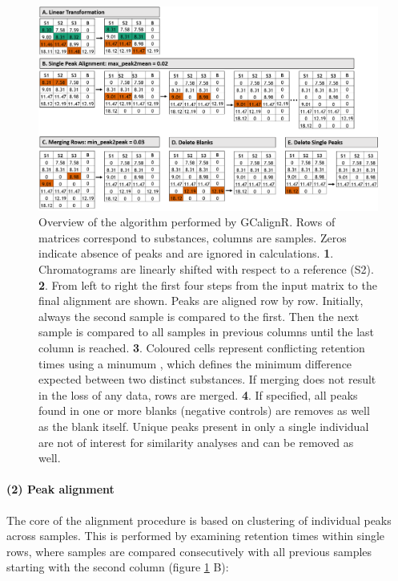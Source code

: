 \begin{figure}[htbp]
  \centering
  \includegraphics[width=13cm]{figures/algorithm}
  \caption{Overview of the algorithm performed by GCalignR. Rows of matrices correspond to substances, columns are samples. Zeros indicate absence of peaks and are ignored in calculations. \textbf{1}. Chromatograms are linearly shifted with respect to a reference (S2). \textbf{2}. From left to right the first four steps from the input matrix to the final alignment are shown. Peaks are aligned row by row. Initially, always the second sample is compared to the first. Then the next sample is compared to all samples in previous columns until the last column is reached. \textbf{3}. Coloured cells represent conflicting retention times using a minumum , which defines the minimum difference expected between two distinct substances. If merging does not result in the loss of any data, rows are merged. \textbf{4}.  If specified, all peaks found in one or more blanks (negative controls) are removes as well as the blank itself. Unique peaks present in only a single individual are not of interest for similarity analyses and can be removed as well.}
  \label{figure:algorithm}
\end{figure}

\paragraph{(2) Peak alignment}\label{peak-alignment}

The core of the alignment procedure is based on clustering of individual
peaks across samples. This is performed by examining retention times
within single rows, where samples are compared consecutively with all
previous samples starting with the second column (figure
\ref{figure:algorithm} B):\par

